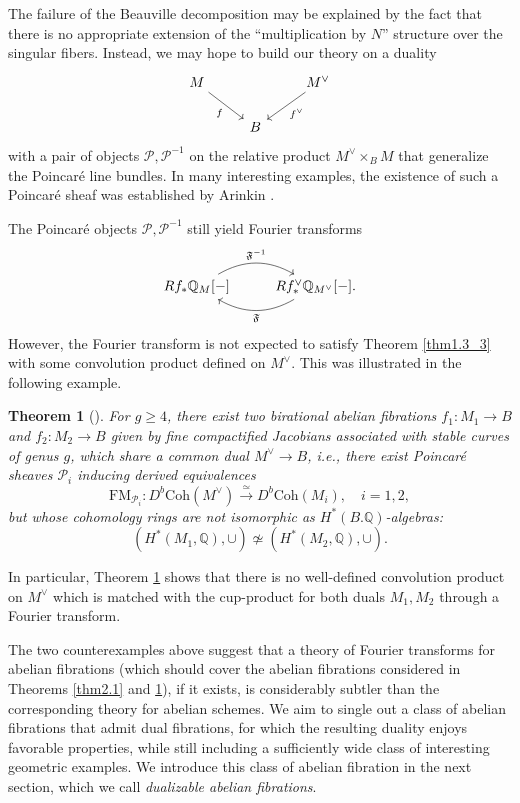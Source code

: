 \documentclass[11pt]{amsart}
\theoremstyle{plain}
\newtheorem{thm}{Theorem}[section]
\theoremstyle{definition}
\theoremstyle{remark}
\newcommand{\BQ}{{\mathbb{Q}}}
\newcommand{\CP}{{\mathcal P}}
\begin{document}
The failure of the Beauville decomposition may be explained by the fact that there is no appropriate extension of the ``multiplication by $N$'' structure over the singular fibers. Instead, we may hope to build our theory on a duality 
\[
\begin{tikzcd}
M \arrow[dr, "f"'] & & M^\vee \arrow[dl, "f^\vee"] \\
& B &
\end{tikzcd}
\]
with a pair of objects $\CP, \CP^{-1}$ on the relative product $M^\vee\times_B M$ that generalize the Poincar\'e line bundles. In many interesting examples, the existence of such a Poincar\'e sheaf was established by Arinkin \cite{A2}.

The Poincar\'e objects $\CP, \CP^{-1}$ still yield Fourier transforms
\[
\begin{tikzcd}
Rf_*\BQ_M[-] \arrow[r, bend left=30, "{\mathfrak{F}^{-1}}"] 
  & Rf^\vee_* \BQ_{M^\vee}[-] \arrow[l, bend left=30, "{\mathfrak{F}}"].
\end{tikzcd}
\]
However, the Fourier transform is not expected to satisfy Theorem \ref{thm1.3_3} with some convolution product defined on $M^\vee$. This was illustrated in the following example.

\begin{thm}[\cite{BMSY2}] \label{thm2.2}
For $g \geq 4$, there exist two birational abelian fibrations $f_1: M_1 \to B$ and $f_2: M_2 \to B$ given by fine compactified Jacobians associated with stable curves of genus $g$, which share a common dual $M^\vee \to B$, \emph{i.e.}, there exist Poincar\'e sheaves $\CP_i$ inducing derived equivalences
\[
\mathrm{FM}_{\CP_i}: \mathrm{}D^b\mathrm{Coh}(M^\vee) \xrightarrow{\simeq} D^b\mathrm{Coh}(M_i), \quad i=1,2,
\]
but whose cohomology rings are not isomorphic as $H^*(B. \BQ)$-algebras:
\[
\left(H^*(M_1, \BQ), \cup\right) \not\simeq  \left(H^*(M_2, \BQ), \cup \right).
\]
\end{thm}

In particular, Theorem \ref{thm2.2} shows that there is no well-defined convolution product on $M^\vee$ which is matched with the cup-product for both duals $M_1, M_2$ through a Fourier transform.

The two counterexamples above suggest that a theory of Fourier transforms for abelian fibrations (which should cover the abelian fibrations considered in Theorems \ref{thm2.1} and \ref{thm2.2}), if it exists, is considerably subtler than the corresponding theory for abelian schemes. We aim to single out a class of abelian fibrations that admit dual fibrations, for which the resulting duality enjoys favorable properties, while still including a sufficiently wide class of interesting geometric examples. We introduce this class of abelian fibration in the next section, which we call \emph{dualizable abelian fibrations}.
\end{document}
